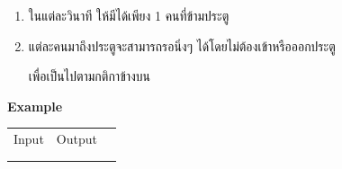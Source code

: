 \documentclass{article}
\begin{document}
\begin{enumerate}

\item

  ในแต่ละวินาที ให้มีได้เพียง 1 คนที่ข้ามประตู

\item

  แต่ละคนมาถึงประตูจะสามารถรอนิ่งๆ ได้โดยไม่ต้องเข้าหรือออกประตู

  เพื่อเป็นไปตามกติกาข้างบน

\end{enumerate}



\textbf{Example}



{\def\LTcaptype{none} %

\begin{longtable}[]{@{}

  >{\raggedright\arraybackslash}p{}

  >{\raggedright\arraybackslash}p{}

  >{\raggedright\arraybackslash}p{}@{}}

\toprule\noalign{}

\begin{minipage}[b]{\linewidth}\raggedright

Input

\end{minipage} & \begin{minipage}[b]{\linewidth}\raggedright

Output

\end{minipage} & \begin{minipage}[b]{\linewidth}\raggedright

Explanation\\

\strut

\end{minipage} \\

\midrule\noalign{}

\endhead

\bottomrule\noalign{}

\endlastfoot

\begin{minipage}[t]{\linewidth}\raggedright


\end{minipage}
\end{longtable}}
\end{document}
